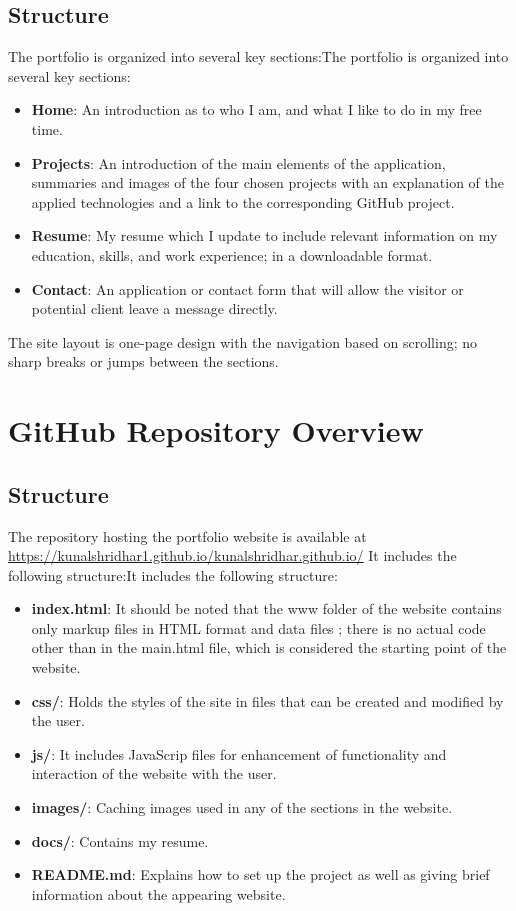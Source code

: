 \documentclass{article}
\begin{document}
\subsection{Structure}
The portfolio is organized into several key sections:The portfolio is organized into several key sections:
\begin{itemize}
\item \textbf{Home}: An introduction as to who I am, and what I like to do in my free time.
\item \textbf{Projects}: An introduction of the main elements of the application, summaries and images of the four chosen projects with an explanation of the applied technologies and a link to the corresponding GitHub project.
\item \textbf{Resume}: My resume which I update to include relevant information on my education, skills, and work experience; in a downloadable format.
\item \textbf{Contact}: An application or contact form that will allow the visitor or potential client leave a message directly.
\end{itemize}
The site layout is one-page design with the navigation based on scrolling; no sharp breaks or jumps between the sections.

\section{GitHub Repository Overview}
\subsection{Structure}
The repository hosting the portfolio website is available at \url{https://kunalshridhar1.github.io/kunalshridhar.github.io/} It includes the following structure:It includes the following structure:
\begin{itemize}
\item \textbf{index.html}: It should be noted that the www folder of the website contains only markup files in HTML format and data files ; there is no actual code other than in the main.html file, which is considered the starting point of the website.
\item \textbf{css/}: Holds the styles of the site in files that can be created and modified by the user.
\item \textbf{js/}: It includes JavaScrip files for enhancement of functionality and interaction of the website with the user.
\item \textbf{images/}: Caching images used in any of the sections in the website.
\item \textbf{docs/}: Contains my resume.
\item \textbf{README.md}: Explains how to set up the project as well as giving brief information about the appearing website.
\end{itemize}
\end{document}
